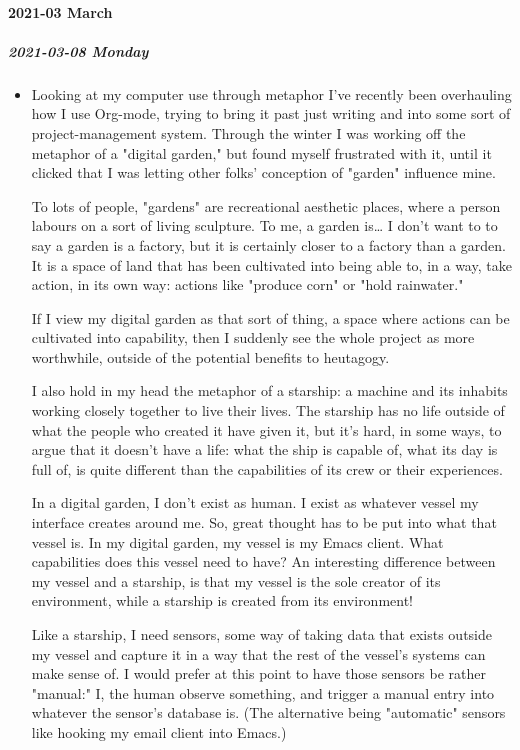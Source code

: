 \documentclass[11pt]{article}
\begin{document}
\paragraph*{2021-03 March}
\label{sec:org7b47bd0}
\startcontents[level-4]
\subparagraph*{2021-03-08 Monday}
\label{sec:org9f94e00}
\begin{itemize}
\item Looking at my computer use through metaphor
\label{sec:org48adbfa}
I've recently been overhauling how I use Org-mode, trying to bring it past just writing and into some sort of project-management system. Through the winter I was working off the metaphor of a "digital garden," but found myself frustrated with it, until it clicked that I was letting other folks' conception of "garden" influence mine.

To lots of people, "gardens" are recreational aesthetic places, where a person labours on a sort of living sculpture. To me, a garden is\ldots{} I don't want to to say a garden is a factory, but it is certainly closer to a factory than a garden. It is a space of land that has been cultivated into being able to, in a way, take action, in its own way: actions like "produce corn" or "hold rainwater."

If I view my digital garden as that sort of thing, a space where actions can be cultivated into capability, then I suddenly see the whole project as more worthwhile, outside of the potential benefits to heutagogy.

I also hold in my head the metaphor of a starship: a machine and its inhabits working closely together to live their lives. The starship has no life outside of what the people who created it have given it, but it's hard, in some ways, to argue that it doesn't have a life: what the ship is capable of, what its day is full of, is quite different than the capabilities of its crew or their experiences.

In a digital garden, I don't exist as human. I exist as whatever vessel my interface creates around me. So, great thought has to be put into what that vessel is. In my digital garden, my vessel is my Emacs client. What capabilities does this vessel need to have? An interesting difference between my vessel and a starship, is that my vessel is the sole creator of its environment, while a starship is created from its environment!

Like a starship, I need sensors, some way of taking data that exists outside my vessel and capture it in a way that the rest of the vessel's systems can make sense of. I would prefer at this point to have those sensors be rather "manual:" I, the human observe something, and trigger a manual entry into whatever the sensor's database is. (The alternative being "automatic" sensors like hooking my email client into Emacs.)


\end{itemize}
\end{document}
